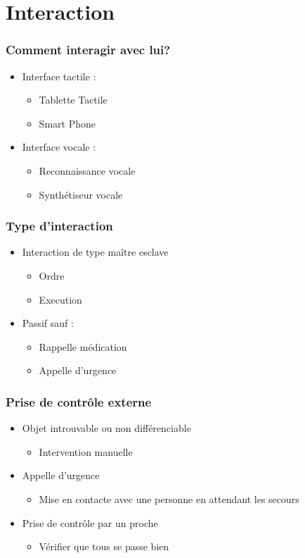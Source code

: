 \section{Interaction}
\begin{frame}
  \frametitle{Comment interagir avec lui?}
      	\begin{itemize}
      	\item Interface tactile :
        	\begin{itemize}
        	\item Tablette Tactile
        	\item Smart Phone 
        	\end{itemize}
	\item Interface vocale :
		\begin{itemize}
		\item Reconnaissance vocale
		\item Synthétiseur vocale
		\end{itemize}
      \end{itemize}
\end{frame}

\begin{frame}
	\frametitle{Type d'interaction}
	\begin{itemize}
	\item Interaction de type maître esclave
		\begin{itemize}
		\item Ordre
		\item Execution
		\end{itemize}
	\item Passif sauf :
		\begin{itemize}
		\item Rappelle médication
		\item Appelle d'urgence
		\end{itemize}
	\end{itemize}
\end{frame}

\begin{frame}
	\frametitle{Prise de contrôle externe}
	\begin{itemize}
	\item Objet introuvable ou non différenciable
		\begin{itemize}
		\item Intervention manuelle
		\end{itemize}
	\item Appelle d'urgence
		\begin{itemize}
		\item Mise en contacte avec une personne en attendant les secours
		\end{itemize}
	\item Prise de contrôle par un proche
		\begin{itemize}
		\item Vérifier que tous se passe bien
		\end{itemize}
	\end{itemize}
\end{frame}

